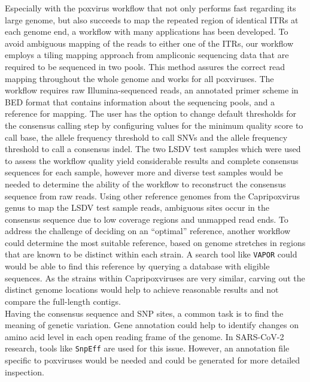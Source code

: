 Especially with the poxvirus workflow that not only performs fast regarding its large genome, but also succeeds to map the repeated region of identical \acp{ITR} at each genome end, a workflow with many applications has been developed. To avoid ambiguous mapping of the reads to either one of the \acp{ITR}, our workflow employs a tiling mapping approach from ampliconic sequencing data that are required to be sequenced in two pools. This method assures the correct read mapping throughout the whole genome and works for all poxviruses. The workflow requires raw Illumina-sequenced reads, an annotated primer scheme in \ac{BED} format that contains information about the sequencing pools, and a reference for mapping. The user has the option to change default thresholds for the consensus calling step by configuring values for the minimum quality score to call base, the allele frequency threshold to call \acp{SNV} and the allele frequency threshold to call a consensus indel. The two \ac{LSDV} test samples which were used to assess the workflow quality yield considerable results and complete consensus sequences for each sample, however more and diverse test samples would be needed to determine the ability of the workflow to reconstruct the consensus sequence from raw reads. Using other reference genomes from the Capripoxvirus genus to map the \ac{LSDV} test sample reads, ambiguous sites occur in the consensus sequence due to low coverage regions and unmapped read ends. To address the challenge of deciding on an ``optimal'' reference, another workflow could determine the most suitable reference, based on genome stretches in regions that are known to be distinct within each strain. A search tool like \texttt{VAPOR} could would be able to find this reference by querying a database with eligible sequences. As the strains within Capripoxviruses are very similar, carving out the distinct genome locations would help to achieve reasonable results and not compare the full-length contigs.\\
Having the consensus sequence and \ac{SNP} sites, a common task is to find the meaning of genetic variation. Gene annotation could help to identify changes on amino acid level in each open reading frame of the genome. In \ac{SARS-CoV-2} research, tools like \texttt{SnpEff} are used for this issue. However, an annotation file specific to poxviruses would be needed and could be generated for more detailed inspection.

